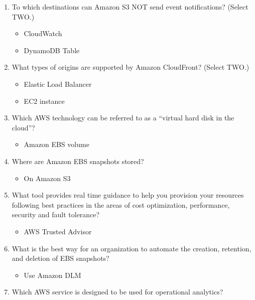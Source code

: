 \begin{enumerate}
	\item To which destinations can Amazon S3 NOT send event notifications? (Select TWO.)

	\begin{itemize}
	\item CloudWatch
	\item DynamoDB Table
\end{itemize}

	\item What types of origins are supported by Amazon CloudFront? (Select TWO.)

	\begin{itemize}
	\item Elastic Load Balancer
	\item EC2 instance
\end{itemize}

	\item Which AWS technology can be referred to as a “virtual hard disk in the cloud”?

	\begin{itemize}
	\item Amazon EBS volume
\end{itemize}

	\item Where are Amazon EBS snapshots stored?

	\begin{itemize}
	\item On Amazon S3
\end{itemize}

	\item What tool provides real time guidance to help you provision your resources following best practices in the areas of cost optimization, performance, security and fault tolerance?

	\begin{itemize}
	\item AWS Trusted Advisor
\end{itemize}

	\item What is the best way for an organization to automate the creation, retention, and deletion of EBS snapshots?

	\begin{itemize}
	\item Use Amazon DLM
\end{itemize}

	\item Which AWS service is designed to be used for operational analytics?


\end{enumerate}
